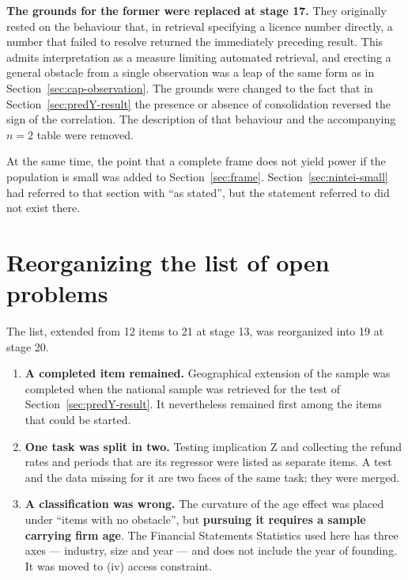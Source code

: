 \textbf{The grounds for the former were replaced at stage 17.} They originally rested on the
behaviour that, in retrieval specifying a licence number directly, a number that failed to resolve
returned the immediately preceding result. This admits interpretation as a measure limiting
automated retrieval, and erecting a general obstacle from a single observation was a leap of the
same form as in Section~\ref{sec:cap-observation}. The grounds were changed to the fact that in
Section~\ref{sec:predY-result} the presence or absence of consolidation reversed the sign of the
correlation. The description of that behaviour and the accompanying $n=2$ table were removed.

At the same time, the point that a complete frame does not yield power if the population is small
was added to Section~\ref{sec:frame}. Section~\ref{sec:nintei-small} had referred to that section
with ``as stated'', but the statement referred to did not exist there.

\section{Reorganizing the list of open problems}

The list, extended from 12 items to 21 at stage 13, was reorganized into 19 at stage 20.

\begin{enumerate}[label=(\arabic*)]
\item \textbf{A completed item remained.} Geographical extension of the sample was completed when
the national sample was retrieved for the test of Section~\ref{sec:predY-result}. It nevertheless
remained first among the items that could be started.

\item \textbf{One task was split in two.} Testing implication Z and collecting the refund rates and
periods that are its regressor were listed as separate items. A test and the data missing for it
are two faces of the same task; they were merged.

\item \textbf{A classification was wrong.} The curvature of the age effect was placed under ``items
with no obstacle'', but \textbf{pursuing it requires a sample carrying firm age}. The Financial
Statements Statistics used here has three axes — industry, size and year — and does not include
the year of founding. It was moved to (iv) access constraint.
\end{enumerate}


